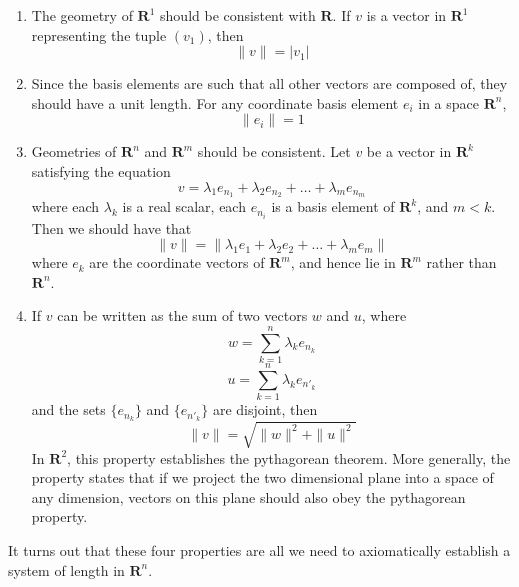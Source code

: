 \begin{enumerate}
  \item The geometry of $\mathbf{R}^1$ should be consistent with $\mathbf{R}$. If $v$ is a vector in $\mathbf{R}^1$ representing the tuple $(v_1)$, then
  \[ \|v\| = |v_1| \]
  \item Since the basis elements are such that all other vectors are composed of, they should have a unit length. For any coordinate basis element $e_i$ in a space $\mathbf{R}^n$,
  \[ \|e_i\| = 1 \]
  \item Geometries of $\mathbf{R}^n$ and $\mathbf{R}^m$ should be consistent. Let $v$ be a vector in $\mathbf{R}^k$ satisfying the equation
  \[ v = \lambda_1 e_{n_1} + \lambda_2 e_{n_2} + \dots + \lambda_m e_{n_m} \]
  where each $\lambda_k$ is a real scalar, each $e_{n_i}$ is a basis element of $\mathbf{R}^k$, and $m < k$. Then we should have that
  \[ \|v\| = \| \lambda_1 e_1 + \lambda_2 e_2 + \dots + \lambda_m e_m \| \]
  where $e_k$ are the coordinate vectors of $\mathbf{R}^m$, and hence lie in $\mathbf{R}^m$ rather than $\mathbf{R}^n$.
  \item If $v$ can be written as the sum of two vectors $w$ and $u$, where
  \[ w = \sum_{k = 1}^n \lambda_k e_{n_k} \]
  \[ u = \sum_{k = 1}^n \lambda_k e_{n'_k} \]
  and the sets $\{ e_{n_k} \}$ and $\{ e_{n'_k} \}$ are disjoint, then
  \[ \|v\| = \sqrt{ \|w\|^2 + \|u\|^2 } \]
  In $\mathbf{R}^2$, this property establishes the pythagorean theorem. More generally, the property states that if we project the two dimensional plane into a space of any dimension, vectors on this plane should also obey the pythagorean property.
\end{enumerate}

It turns out that these four properties are all we need to axiomatically establish a system of length in $\mathbf{R}^n$.

